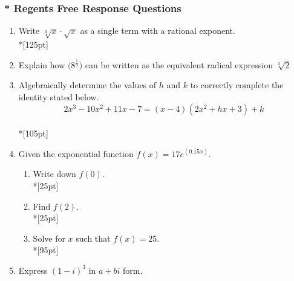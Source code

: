 \documentclass[12pt, twoside]{article}
\begin{document}
\subsubsection*{\\* Regents Free Response Questions}

\begin{enumerate}\addtocounter{enumi}{10}

\vspace{1 cm}

\item Write $\sqrt[3]{x} \cdot \sqrt{x}$ as a single term with a rational exponent.\\*[125pt]

\item Explain how  $\displaystyle \big( 8^\frac{1}{9} \big) $ can be written as the equivalent radical expression $\sqrt[3]2$

\newpage

\item Algebraically determine the values of $h$ and $k$ to correctly complete the identity stated below. \[2x^3-10x^2 +11x - 7 = (x - 4)(2x^2 + hx + 3) + k\]\\*[105pt]

\item Given the exponential function $\displaystyle f(x)=17e^{(0.15x)}$.
\begin{enumerate}
    \item Write down $f(0)$.\\*[25pt]
    \item Find $f(2)$.\\*[25pt]
    \item Solve for $x$ such that $f(x)=25$.\\*[95pt]
\end{enumerate}

\item Express $(1-i)^3 \text{ in } a+bi$ form.

\end{enumerate}
\end{document}
